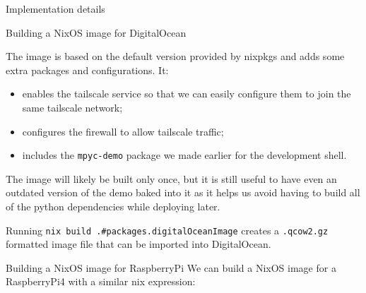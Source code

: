\begin{frame}[fragile]{Implementation details}
\begin{block}{Building a NixOS image for DigitalOcean}
\begin{Shaded}
\begin{Highlighting}[]
   \OperatorTok{=} \OperatorTok{;} \OperatorTok{[}
  \OperatorTok{]} \OperatorTok{++}\OperatorTok{;}

   \OperatorTok{=} \OperatorTok{;}

   \OperatorTok{=} \OperatorTok{\{}
     \OperatorTok{=} \OperatorTok{;}
     \OperatorTok{=} \OperatorTok{;}
     \OperatorTok{=} \OperatorTok{[}  \OperatorTok{];}
  \OperatorTok{\};}
\OperatorTok{\}}
\end{Highlighting}
\end{Shaded}

The image is based on the default version provided by nixpkgs and adds
some extra packages and configurations. It:

\begin{itemize}
\tightlist
\item
  enables the tailscale service so that we can easily configure them to
  join the same tailscale network;
\item
  configures the firewall to allow tailscale traffic;
\item
  includes the \texttt{mpyc-demo} package we made earlier for the
  development shell.
\end{itemize}

The image will likely be built only once, but it is still useful to have
even an outdated version of the demo baked into it as it helps us avoid
having to build all of the python dependencies while deploying later.

Running \texttt{nix\ build\ .\#packages.digitalOceanImage} creates a
\texttt{.qcow2.gz} formatted image file that can be imported into
DigitalOcean.
\end{block}

\begin{block}{Building a NixOS image for RaspberryPi}
\protect\hypertarget{building-a-nixos-image-for-raspberrypi}{}
We can build a NixOS image for a RaspberryPi4 with a similar nix
expression:

\begin{Shaded}
\begin{Highlighting}[]
\OperatorTok{\{}
   \OperatorTok{=} \OperatorTok{\{}
     \OperatorTok{=} \OperatorTok{;}
  \OperatorTok{\};}


\end{Highlighting}
\end{Shaded}
\end{block}
\end{frame}
